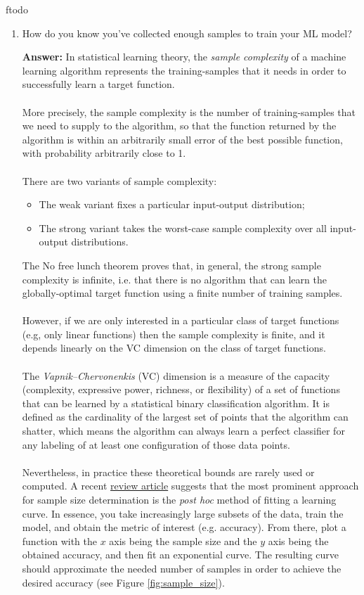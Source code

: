 ƒtodo\documentclass{article}
\newenvironment{QandA}{\begin{enumerate}[label=\arabic*.]}{\end{enumerate}}
\newenvironment{answer}{\par\normalfont \textbf{Answer:}}{}
\begin{document}
\begin{QandA}
    \item How do you know you’ve collected enough samples to train your ML model?
    \begin{answer}
        In statistical learning theory, the \textit{sample complexity} of a machine learning algorithm represents the training-samples that it needs in order to successfully learn a target function. \\\\
        More precisely, the sample complexity is the number of training-samples that we need to supply to the algorithm, so that the function returned by the algorithm is within an arbitrarily small error of the best possible function, with probability arbitrarily close to 1. \\\\
        There are two variants of sample complexity:
        \begin{itemize}
            \item The weak variant fixes a particular input-output distribution;
            \item The strong variant takes the worst-case sample complexity over all input-output distributions.
        \end{itemize}
        The No free lunch theorem proves that, in general, the strong sample complexity is infinite, i.e. that there is no algorithm that can learn the globally-optimal target function using a finite number of training samples. \\\\
        However, if we are only interested in a particular class of target functions (e.g, only linear functions) then the sample complexity is finite, and it depends linearly on the VC dimension on the class of target functions. \\\\
        The \textit{Vapnik–Chervonenkis} (VC) dimension is a measure of the capacity (complexity, expressive power, richness, or flexibility) of a set of functions that can be learned by a statistical binary classification algorithm. It is defined as the cardinality of the largest set of points that the algorithm can shatter, which means the algorithm can always learn a perfect classifier for any labeling of at least one configuration of those data points. \\\\
        Nevertheless, in practice these theoretical bounds are rarely used or computed. A recent \href{https://www.researchgate.net/publication/335779941_Sample-Size_Determination_Methodologies_for_Machine_Learning_in_Medical_Imaging_Research_A_Systematic_Review}{review article} suggests that the most prominent approach for sample size determination is the \textit{post hoc} method of fitting a learning curve. In essence, you take increasingly large subsets of the data, train the model, and obtain the metric of interest (e.g. accuracy). From there, plot a function with the $x$ axis being the sample size and the $y$ axis being the obtained accuracy, and then fit an exponential curve. The resulting curve should approximate the needed number of samples in order to achieve the desired accuracy (see Figure \ref{fig:sample_size}).


\end{answer}
\end{QandA}
\end{document}
